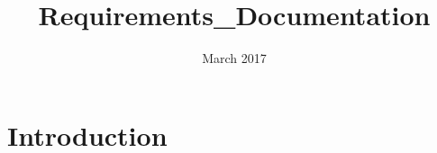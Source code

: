 \documentclass{article}
\title{Requirements\_Documentation}
\author{}
\date{March 2017}
\begin{document}
\maketitle

\section{Introduction}
\end{document}
